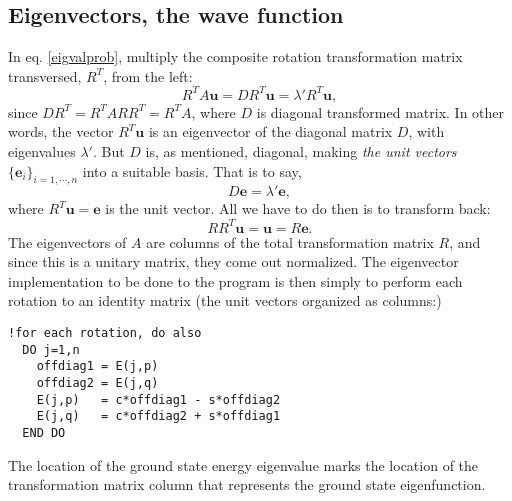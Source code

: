 \documentclass[a4paper,twocolumn,nofootinbib]{revtex4-1}
\newcommand{\bol}[1]{\boldsymbol{#1}}
\begin{document}
\subsection*{Eigenvectors, the wave function}
In eq. \eqref{eigvalprob}, multiply the composite rotation transformation matrix transversed, $R^T$,
from the left:
\[ R^TA\bol{u}=DR^T\bol{u}=\lambda'R^T\bol{u},\]
since $DR^T=R^TARR^T=R^TA$, where $D$ is diagonal transformed matrix. In other words, the vector $R^T\bol{u}$
is an eigenvector of the diagonal matrix $D$, with eigenvalues $\lambda'$. But $D$ is, as mentioned, diagonal, making
\textit{the unit vectors} $\{\bol{e}_i\}_{i=1,\cdots,n}$ into a suitable basis. That is to say,
\[ D\bol{e}=\lambda'\bol{e},\]
where $R^T\bol{u}=\bol{e}$ is the unit vector. All we have to do then is to transform back: \[ R R^T\bol{u}=\bol{u}=R\bol{e}.\]
The eigenvectors of $A$ are columns of the total transformation matrix $R$, and since this is a unitary matrix, they come out normalized.
The eigenvector implementation to be done to the program is then simply to perform each rotation to an identity matrix (the unit vectors organized as columns:)
\begin{lstlisting}[title={Eigenvector update}]
!for each rotation, do also
  DO j=1,n
    offdiag1 = E(j,p)
    offdiag2 = E(j,q)
    E(j,p)   = c*offdiag1 - s*offdiag2
    E(j,q)   = c*offdiag2 + s*offdiag1
  END DO
\end{lstlisting}
The location of the ground state energy eigenvalue marks the location of the transformation matrix column that represents the ground state eigenfunction.
\end{document}
